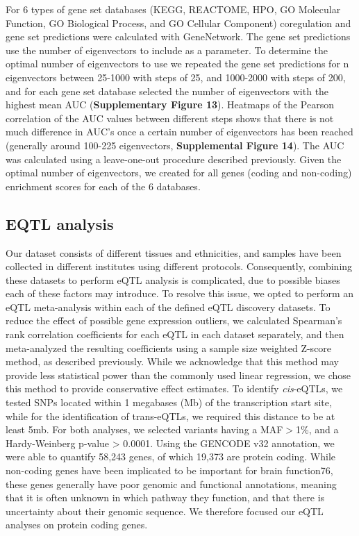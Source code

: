 {{For 6 types of gene set databases (KEGG, REACTOME, HPO, GO Molecular Function, GO Biological Process, and GO Cellular Component) coregulation and gene set predictions were calculated with GeneNetwork. The gene set predictions use the number of eigenvectors to include as a parameter. To determine the optimal number of eigenvectors to use we repeated the gene set predictions for n eigenvectors between 25-1000 with steps of 25, and 1000-2000 with steps of 200, and for each gene set database selected the number of eigenvectors with the highest mean AUC (\textbf{Supplementary Figure 13}). Heatmaps of the Pearson correlation of the AUC values between different steps shows that there is not much difference in AUC’s once a certain number of eigenvectors has been reached (generally around 100-225 eigenvectors, \textbf{Supplemental Figure 14}). The AUC was calculated using a leave-one-out procedure described previously\cite{jassalReactomePathwayKnowledgebase2020}. Given the optimal number of eigenvectors, we created for all genes (coding and non-coding) enrichment scores for each of the 6 databases. 

\subsection{EQTL analysis}
Our dataset consists of different tissues and ethnicities, and samples have been collected in different institutes using different protocols. Consequently, combining these datasets to perform eQTL analysis is complicated, due to possible biases each of these factors may introduce. To resolve this issue, we opted to perform an eQTL meta-analysis within each of the defined eQTL discovery datasets. To reduce the effect of possible gene expression outliers, we calculated Spearman’s rank correlation coefficients for each eQTL in each dataset separately, and then meta-analyzed the resulting coefficients using a sample size weighted Z-score method, as described previously\cite{vosaUnravelingPolygenicArchitecture2018}. While we acknowledge that this method may provide less statistical power than the commonly used linear regression, we chose this method to provide conservative effect estimates. To identify \emph{cis}-eQTLs, we tested SNPs located within 1 megabases (Mb) of the transcription start site, while for the identification of trans-eQTLs, we required this distance to be at least 5mb. For both analyses, we selected variants having a MAF$>$1\%, and a Hardy-Weinberg p-value > 0.0001. Using the GENCODE v32 annotation, we were able to quantify 58,243 genes, of which 19,373 are protein coding. While non-coding genes have been implicated to be important for brain function76, these genes generally have poor genomic and functional annotations, meaning that it is often unknown in which pathway they function, and that there is uncertainty about their genomic sequence. We therefore focused our eQTL analyses on protein coding genes. 

}}
